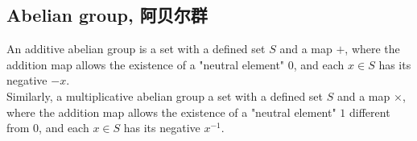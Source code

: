 \subsection{Abelian group, 阿贝尔群}
An additive abelian group is a set with a defined set $S$ and a map $+$, where the addition map allows the existence of a "neutral element" $0$, and each $x \in S$ has its negative $-x$. \\
Similarly, a multiplicative abelian group a set with a defined set $S$ and a map $\times$, where the addition map allows the existence of a "neutral element" $1$ different from $0$, and each $x \in S$ has its negative $x^{-1}$.
\newpage